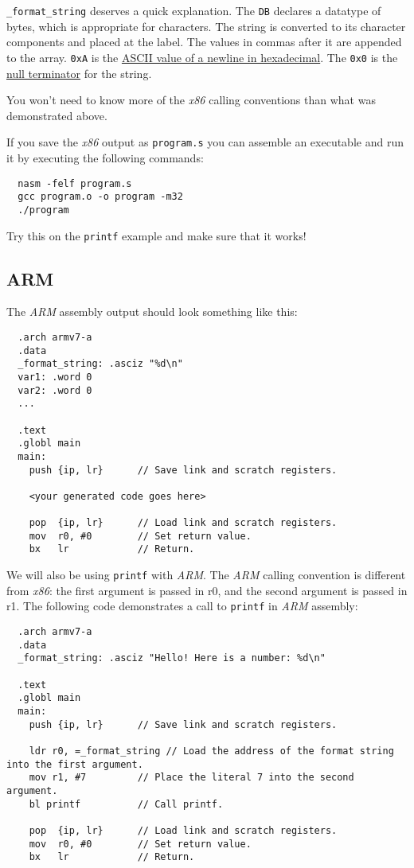 \documentclass{article}
\newcommand{\code}[1]{\texttt{\textmd{#1}}}
\begin{document}
\code{\_format\_string} deserves a quick explanation. The \code{DB} declares a datatype of bytes,
which is appropriate for characters. The string is converted to its character components and
placed at the label. The values in commas after it are appended to the array. \code{0xA} is the
\href{http://www.asciitable.com/}{ASCII value of a newline in hexadecimal}. The \code{0x0} is the
\href{https://en.wikipedia.org/wiki/Null-terminated_string}{null terminator} for the string.

You won't need to know more of the \textit{x86} calling conventions than what was demonstrated
above.

If you save the \textit{x86} output as \code{program.s} you can assemble an executable and run it
by executing the following commands:
\begin{lstlisting}
  nasm -felf program.s
  gcc program.o -o program -m32
  ./program
\end{lstlisting}

Try this on the \code{printf} example and make sure that it works!

\subsection{ARM}
The \textit{ARM} assembly output should look something like this:
\begin{lstlisting}
  .arch armv7-a
  .data
  _format_string: .asciz "%d\n"
  var1: .word 0
  var2: .word 0
  ...

  .text
  .globl main
  main:
    push {ip, lr}      // Save link and scratch registers.

    <your generated code goes here>

    pop  {ip, lr}      // Load link and scratch registers.
    mov  r0, #0        // Set return value.
    bx   lr            // Return.
\end{lstlisting}

We will also be using \code{printf} with \textit{ARM}. The \textit{ARM} calling convention is
different from \textit{x86}: the first argument is passed in r0, and the second argument is passed
in r1. The following code demonstrates a call to \code{printf} in \textit{ARM} assembly:
\begin{lstlisting}
  .arch armv7-a
  .data
  _format_string: .asciz "Hello! Here is a number: %d\n"

  .text
  .globl main
  main:
    push {ip, lr}      // Save link and scratch registers.

    ldr r0, =_format_string // Load the address of the format string into the first argument.
    mov r1, #7         // Place the literal 7 into the second argument.
    bl printf          // Call printf.

    pop  {ip, lr}      // Load link and scratch registers.
    mov  r0, #0        // Set return value.
    bx   lr            // Return.
\end{lstlisting}
\end{document}
